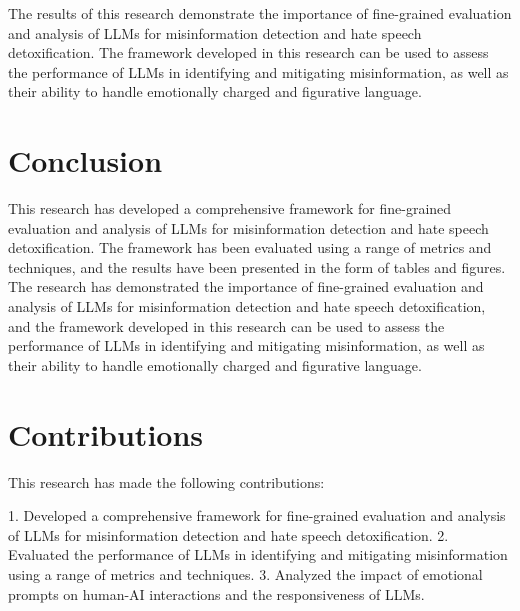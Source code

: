 \documentclass{article}
\begin{document}
The results of this research demonstrate the importance of fine-grained evaluation and analysis of LLMs for misinformation detection and hate speech detoxification. The framework developed in this research can be used to assess the performance of LLMs in identifying and mitigating misinformation, as well as their ability to handle emotionally charged and figurative language.

\section{Conclusion}

This research has developed a comprehensive framework for fine-grained evaluation and analysis of LLMs for misinformation detection and hate speech detoxification. The framework has been evaluated using a range of metrics and techniques, and the results have been presented in the form of tables and figures. The research has demonstrated the importance of fine-grained evaluation and analysis of LLMs for misinformation detection and hate speech detoxification, and the framework developed in this research can be used to assess the performance of LLMs in identifying and mitigating misinformation, as well as their ability to handle emotionally charged and figurative language.

\section{Contributions}

This research has made the following contributions:

1.  Developed a comprehensive framework for fine-grained evaluation and analysis of LLMs for misinformation detection and hate speech detoxification.
2.  Evaluated the performance of LLMs in identifying and mitigating misinformation using a range of metrics and techniques.
3.  Analyzed the impact of emotional prompts on human-AI interactions and the responsiveness of LLMs.
\end{document}
